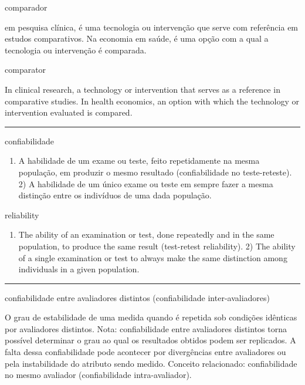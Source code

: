 \documentclass[
]{book}
\providecommand{\tightlist}{%
  \setlength{\itemsep}{0pt}\setlength{\parskip}{0pt}}
\begin{document}
comparador

em pesquisa clínica, é uma tecnologia ou intervenção que serve com referência em estudos comparativos. Na economia em saúde, é uma opção com a qual a tecnologia ou intervenção é comparada.

comparator

In clinical research, a technology or intervention that serves as a reference in comparative studies. In health economics, an option with which the technology or intervention evaluated is compared.

\begin{center}\rule{0.5\linewidth}{0.5pt}\end{center}

confiabilidade

\begin{enumerate}
\def\labelenumi{\arabic{enumi})}
\tightlist
\item
  A habilidade de um exame ou teste, feito repetidamente na mesma população, em produzir o mesmo resultado (confiabilidade no teste-reteste). 2) A habilidade de um único exame ou teste em sempre fazer a mesma distinção entre os indivíduos de uma dada população.
\end{enumerate}

reliability

\begin{enumerate}
\def\labelenumi{\arabic{enumi})}
\tightlist
\item
  The ability of an examination or test, done repeatedly and in the same population, to produce the same result (test-retest reliability). 2) The ability of a single examination or test to always make the same distinction among individuals in a given population.
\end{enumerate}

\begin{center}\rule{0.5\linewidth}{0.5pt}\end{center}

confiabilidade entre avaliadores distintos (confiabilidade inter-avaliadores)

O grau de estabilidade de uma medida quando é repetida sob condições idênticas por avaliadores distintos. Nota: confiabilidade entre avaliadores distintos torna possível determinar o grau ao qual os resultados obtidos podem ser replicados. A falta dessa confiabilidade pode acontecer por divergências entre avaliadores ou pela instabilidade do atributo sendo medido. Conceito relacionado: confiabilidade no mesmo avaliador (confiabilidade intra-avaliador).
\end{document}
